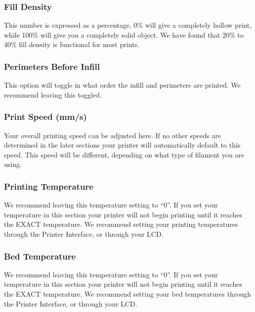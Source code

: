 \subsubsection{Fill Density}
This number is expressed as a percentage. 0\% will give a completely hollow print, while 100\% will give you a completely solid object. We have found that 20\% to 40\% fill density is functional for most prints.

\subsubsection{Perimeters Before Infill}
This option will toggle in what order the infill and perimeters are printed. We recommend leaving this toggled.
\subsubsection{Print Speed (mm/s)}
Your overall printing speed can be adjusted here. If no other speeds are determined in the later sections your printer will automatically default to this speed. This speed will be different, depending on what type of filament you are using.

\subsubsection{Printing Temperature}

We recommend leaving this temperature setting to “0”. If you set your temperature in this section your printer will not begin printing until it reaches the EXACT temperature. We recommend setting your printing temperatures through the Printer Interface, or through your LCD.

\subsubsection{Bed Temperature}
We recommend leaving this temperature setting to “0”. If you set your temperature in this section your printer will not begin printing until it reaches the EXACT temperature. We recommend setting your bed temperatures through the Printer Interface, or through your LCD.

